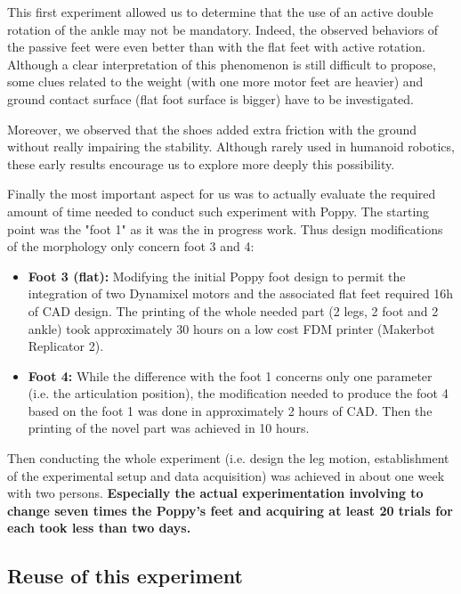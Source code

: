 This first experiment allowed us to determine that the use of an active double rotation of the ankle may not be mandatory. Indeed, the observed behaviors of the passive feet were even better than with the flat feet with active rotation. Although a clear interpretation of this phenomenon is still difficult to propose, some clues related to the weight (with one more motor feet are heavier) and ground contact surface (flat foot surface is bigger) have to be investigated.

Moreover, we observed that the shoes added extra friction with the ground without really impairing the stability. Although rarely used in humanoid robotics, these early results encourage us to explore more deeply this possibility.

Finally the most important aspect for us was to actually evaluate the required amount of time needed to conduct such experiment with Poppy. The starting point was the "foot 1" as it was the in progress work. Thus design modifications of the morphology only concern foot 3 and 4:
\begin{itemize}
    \item \textbf{Foot 3 (flat):} Modifying the initial Poppy foot design to permit the integration of two Dynamixel motors and the associated flat feet required 16h of CAD design. The printing of the whole needed part (2 legs, 2 foot and 2 ankle) took approximately 30 hours on a low cost FDM printer (Makerbot Replicator 2).
    \item \textbf{Foot 4:} While the difference with the foot 1 concerns only one parameter (i.e. the articulation position), the modification needed to produce the foot 4 based on the foot 1 was done in approximately 2 hours of CAD. Then the printing of the novel part was achieved in 10 hours.
\end{itemize}

Then conducting the whole experiment (i.e. design the leg motion, establishment of the experimental setup and data acquisition) was achieved in about one week with two persons. \textbf{Especially the actual experimentation involving to change seven times the Poppy's feet and acquiring at least 20 trials for each took less than two days.}

\subsection{Reuse of this experiment} %

